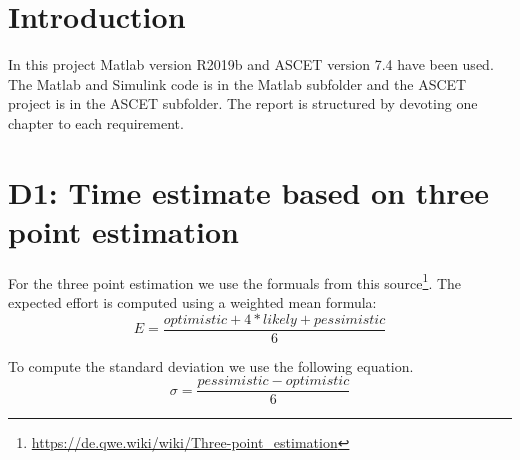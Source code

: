 
\chapter{Introduction}\label{cha:Introduction}
In this project Matlab version R2019b and ASCET version 7.4 have been used.
The Matlab and Simulink code is in the Matlab subfolder and the ASCET project is in the ASCET subfolder.
The report is structured by devoting one chapter to each requirement.

\chapter{D1: Time estimate based on three point estimation}\label{cha:D1}
For the three point estimation we use the formuals from this source\footnote{\url{https://de.qwe.wiki/wiki/Three-point_estimation}}.
The expected effort is computed using a weighted mean formula:
\begin{equation}
	E = \frac{optimistic + 4*likely + pessimistic}{6}
\end{equation}

To compute the standard deviation we use the following equation.
\begin{equation}
	\sigma = \frac{pessimistic-optimistic}{6}
\end{equation}

